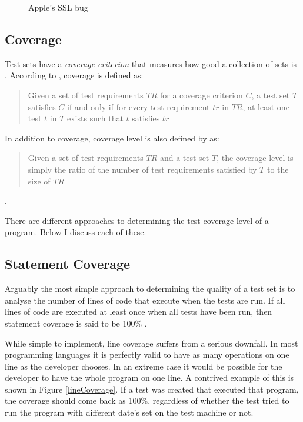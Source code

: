 \begin{figure}
	\centering
	
	\caption{Apple's SSL bug}
	\label{fig:AppleBug}
\end{figure}

\subsection{Coverage}

Test sets have a \emph{coverage criterion} that measures how good a collection of sets is \citep{softwareTestingIntro}. According to \citet{softwareTestingIntro}, coverage is defined as:

\begin{quote} Given a set of test requirements $TR$ for a coverage criterion $C$, a test set $T$ satisfies $C$ if and only if for every test requirement $tr$ in $TR$, at least one test $t$ in $T$ exists such that $t$ satisfies $tr$ \end{quote}

In addition to coverage, coverage level is also defined by \citep{softwareTestingIntro} as:

\begin{quote}Given a set of test requirements $TR$ and a test set $T$, the coverage level is simply the ratio of the number of test requirements satisfied by $T$ to the size of $TR$\end{quote}.

There are different approaches to determining the test coverage level of a program. Below I discuss each of these.

\subsection{Statement Coverage}

Arguably the most simple approach to determining the quality of a test set is to analyse the number of lines of code that execute when the tests are run. If all lines of code are executed at least once when all tests have been run, then statement coverage is said to be 100\% \citep{softwareTestingIntro}.

While simple to implement, line coverage suffers from a serious downfall. In most programming languages it is perfectly valid to have as many operations on one line as the developer chooses. In an extreme case it would be possible for the developer to have the whole program on one line. A contrived example of this is shown in Figure \ref{lineCoverage}. If a test was created that executed that program, the coverage should come back as 100\%, regardless of whether the test tried to run the program with different date's set on the test machine or not.

